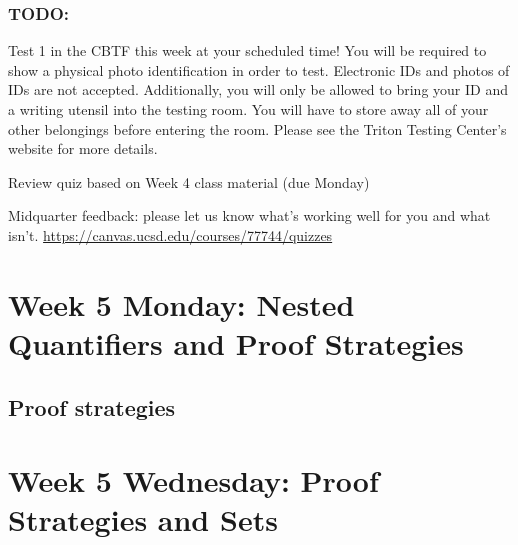 \subsubsection*{TODO:}
\begin{list}{\itemsep2pt}
    \item Test 1 in the CBTF this week at your scheduled time!
You will be required to show a physical photo identification in order
to test. Electronic IDs and photos of IDs are not accepted. Additionally, you will only be allowed
to bring your ID and a writing utensil into the testing room. You will have to store away all of
your other belongings before entering the room. Please see the Triton Testing Center's website
for more details.
    \item Review quiz based on Week 4 class material (due Monday)
    \item Midquarter feedback: please let us know what's working well for you and what isn't.  \url{https://canvas.ucsd.edu/courses/77744/quizzes}
\end{list}
\newpage

\section*{Week 5 Monday: Nested Quantifiers and Proof Strategies}



\vfill

\newpage
\subsection*{Proof strategies}

%

\vfill

\vfill

\vfill


\newpage
\section*{Week 5 Wednesday: Proof Strategies and Sets}


